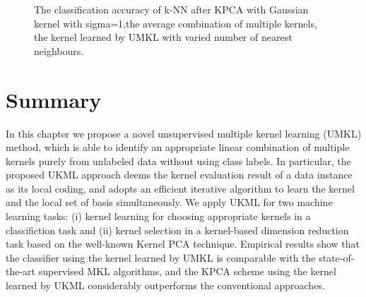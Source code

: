 \begin{figure}[!ht]
\begin{center}
{}
\caption{The classification accuracy of k-NN after KPCA with Gaussian kernel with sigma=1,the average combination of multiple kernels, the kernel learned by UMKL with varied number of nearest neighbours.}
\end{center}
\end{figure}

\section{Summary}\label{sec:acml-con}

In this chapter we propose a novel unsupervised multiple kernel learning (UMKL) method, which is able to identify an appropriate linear combination of multiple kernels purely from unlabeled data without using class labels. In particular, the proposed UKML approach deems the kernel evaluation result of a data instance as its local coding, and adopts an efficient iterative algorithm to learn the kernel and the local set of basis simultaneously. We apply UKML for two machine learning tasks: (i) kernel learning for choosing appropriate kernels in a classifiction task and (ii) kernel selection in a kernel-based dimension reduction task based on the well-known Kernel PCA technique.  Empirical results show that the classifier using the kernel learned by UMKL is comparable with the state-of-the-art supervised MKL algorithms, and the KPCA scheme using the kernel learned by UKML considerably outperforms the conventional approaches.

